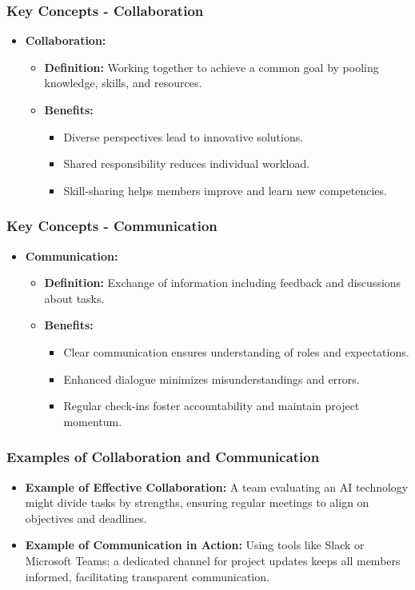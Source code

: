 \documentclass[aspectratio=169]{beamer}
\begin{document}
\begin{frame}[fragile]
    \frametitle{Key Concepts - Collaboration}
    \begin{itemize}
        \item \textbf{Collaboration:}
        \begin{itemize}
            \item \textbf{Definition:} Working together to achieve a common goal by pooling knowledge, skills, and resources.
            \item \textbf{Benefits:}
            \begin{itemize}
                \item Diverse perspectives lead to innovative solutions.
                \item Shared responsibility reduces individual workload.
                \item Skill-sharing helps members improve and learn new competencies.
            \end{itemize}
        \end{itemize}
    \end{itemize}
\end{frame}

\begin{frame}[fragile]
    \frametitle{Key Concepts - Communication}
    \begin{itemize}
        \item \textbf{Communication:}
        \begin{itemize}
            \item \textbf{Definition:} Exchange of information including feedback and discussions about tasks.
            \item \textbf{Benefits:}
            \begin{itemize}
                \item Clear communication ensures understanding of roles and expectations.
                \item Enhanced dialogue minimizes misunderstandings and errors.
                \item Regular check-ins foster accountability and maintain project momentum.
            \end{itemize}
        \end{itemize}
    \end{itemize}
\end{frame}

\begin{frame}[fragile]
    \frametitle{Examples of Collaboration and Communication}
    \begin{itemize}
        \item \textbf{Example of Effective Collaboration:} A team evaluating an AI technology might divide tasks by strengths, ensuring regular meetings to align on objectives and deadlines.
        
        \item \textbf{Example of Communication in Action:} Using tools like Slack or Microsoft Teams; a dedicated channel for project updates keeps all members informed, facilitating transparent communication.
    \end{itemize}
\end{frame}
\end{document}
